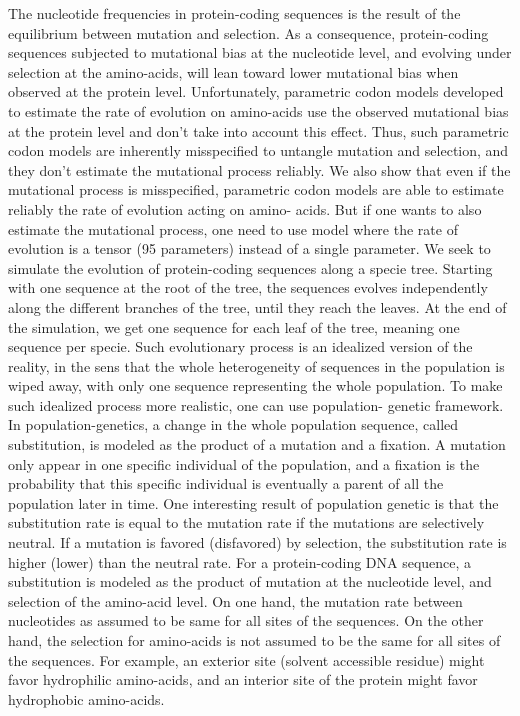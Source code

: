 \documentclass{article}
\begin{document}
	The nucleotide frequencies in protein-coding sequences is the result of the equilibrium between mutation and
	selection. As a consequence, protein-coding sequences subjected to mutational bias at the nucleotide level,
	and evolving under selection at the amino-acids, will lean toward lower mutational bias when observed at
	the protein level. Unfortunately, parametric codon models developed to estimate the rate of evolution on
	amino-acids use the observed mutational bias at the protein level and don’t take into account this effect.
	Thus, such parametric codon models are inherently misspecified to untangle mutation and selection, and
	they don’t estimate the mutational process reliably. We also show that even if the mutational process is
	misspecified, parametric codon models are able to estimate reliably the rate of evolution acting on amino-
	acids. But if one wants to also estimate the mutational process, one need to use model where the rate of
	evolution is a tensor (95 parameters) instead of a single parameter.
	We seek to simulate the evolution of protein-coding sequences along a specie tree. Starting with one
	sequence at the root of the tree, the sequences evolves independently along the different branches of the
	tree, until they reach the leaves. At the end of the simulation, we get one sequence for each leaf of the
	tree, meaning one sequence per specie. Such evolutionary process is an idealized version of the reality, in
	the sens that the whole heterogeneity of sequences in the population is wiped away, with only one sequence
	representing the whole population. To make such idealized process more realistic, one can use population-
	genetic framework. In population-genetics, a change in the whole population sequence, called substitution,
	is modeled as the product of a mutation and a fixation. A mutation only appear in one specific individual of
	the population, and a fixation is the probability that this specific individual is eventually a parent of all the
	population later in time. One interesting result of population genetic is that the substitution rate is equal to
	the mutation rate if the mutations are selectively neutral. If a mutation is favored (disfavored) by selection,
	the substitution rate is higher (lower) than the neutral rate.
	For a protein-coding DNA sequence, a substitution is modeled as the product of mutation at the nucleotide
	level, and selection of the amino-acid level. On one hand, the mutation rate between nucleotides as assumed
	to be same for all sites of the sequences. On the other hand, the selection for amino-acids is not assumed
	to be the same for all sites of the sequences. For example, an exterior site (solvent accessible residue) might
	favor hydrophilic amino-acids, and an interior site of the protein might favor hydrophobic amino-acids.
	
\end{document}
